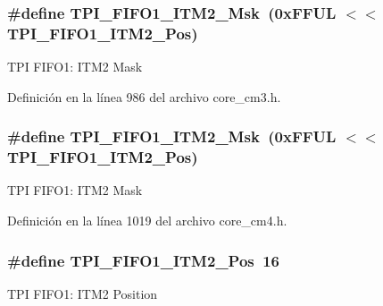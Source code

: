 \subsubsection[{\texorpdfstring{T\+P\+I\+\_\+\+F\+I\+F\+O1\+\_\+\+I\+T\+M2\+\_\+\+Msk}{TPI_FIFO1_ITM2_Msk}}]{\setlength{\rightskip}{0pt plus 5cm}\#define T\+P\+I\+\_\+\+F\+I\+F\+O1\+\_\+\+I\+T\+M2\+\_\+\+Msk~(0x\+F\+F\+U\+L $<$$<$ T\+P\+I\+\_\+\+F\+I\+F\+O1\+\_\+\+I\+T\+M2\+\_\+\+Pos)}\hypertarget{group___c_m_s_i_s___t_p_i_gae54512f926ebc00f2e056232aa21d335}{}\label{group___c_m_s_i_s___t_p_i_gae54512f926ebc00f2e056232aa21d335}
T\+PI F\+I\+F\+O1\+: I\+T\+M2 Mask 

Definición en la línea 986 del archivo core\+\_\+cm3.\+h.

\subsubsection[{\texorpdfstring{T\+P\+I\+\_\+\+F\+I\+F\+O1\+\_\+\+I\+T\+M2\+\_\+\+Msk}{TPI_FIFO1_ITM2_Msk}}]{\setlength{\rightskip}{0pt plus 5cm}\#define T\+P\+I\+\_\+\+F\+I\+F\+O1\+\_\+\+I\+T\+M2\+\_\+\+Msk~(0x\+F\+F\+U\+L $<$$<$ T\+P\+I\+\_\+\+F\+I\+F\+O1\+\_\+\+I\+T\+M2\+\_\+\+Pos)}\hypertarget{group___c_m_s_i_s___t_p_i_gae54512f926ebc00f2e056232aa21d335}{}\label{group___c_m_s_i_s___t_p_i_gae54512f926ebc00f2e056232aa21d335}
T\+PI F\+I\+F\+O1\+: I\+T\+M2 Mask 

Definición en la línea 1019 del archivo core\+\_\+cm4.\+h.

\subsubsection[{\texorpdfstring{T\+P\+I\+\_\+\+F\+I\+F\+O1\+\_\+\+I\+T\+M2\+\_\+\+Pos}{TPI_FIFO1_ITM2_Pos}}]{\setlength{\rightskip}{0pt plus 5cm}\#define T\+P\+I\+\_\+\+F\+I\+F\+O1\+\_\+\+I\+T\+M2\+\_\+\+Pos~16}\hypertarget{group___c_m_s_i_s___t_p_i_ga1828c228f3940005f48fb8dd88ada35b}{}\label{group___c_m_s_i_s___t_p_i_ga1828c228f3940005f48fb8dd88ada35b}
T\+PI F\+I\+F\+O1\+: I\+T\+M2 Position 

